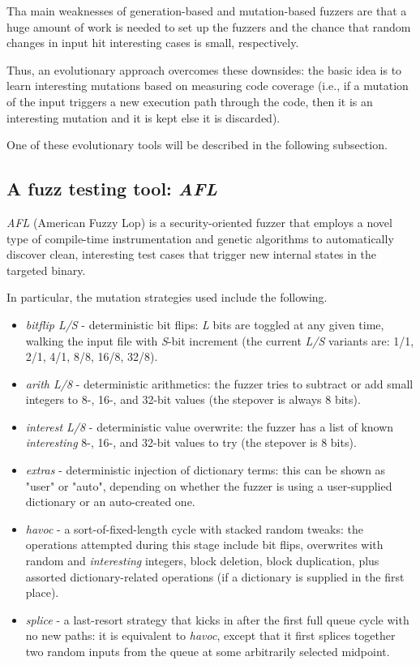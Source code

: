 Tha main weaknesses of generation-based and mutation-based fuzzers are that a huge amount of work is needed to set up the fuzzers and the chance that random changes in input hit interesting cases is small, respectively.

Thus, an evolutionary approach overcomes these downsides: the basic idea is to learn interesting mutations based on measuring code coverage (i.e., if a mutation of the input triggers a new execution path through the code, then it is an interesting mutation and it is kept else it is discarded).

One of these evolutionary tools will be described in the following subsection.

\subsection{A fuzz testing tool: \textit{AFL}}
\textit{AFL}\parencite{AFL} (American Fuzzy Lop) is a security-oriented fuzzer that employs a novel type of compile-time instrumentation and genetic algorithms to automatically discover clean, interesting test cases that trigger new internal states in the targeted binary.

In particular, the mutation strategies used include the following\parencite{AFL_status}.
\begin{itemize}[itemsep=1pt]
    \item \textit{bitflip L/S} - deterministic bit flips: \textit{L} bits are toggled at any given time, walking the input file with \textit{S}-bit increment (the current \textit{L/S} variants are: 1/1, 2/1, 4/1, 8/8, 16/8, 32/8).
    \item \textit{arith L/8} - deterministic arithmetics: the fuzzer tries to subtract or add small integers to 8-, 16-, and 32-bit values (the stepover is always 8 bits).
    \item \textit{interest L/8} - deterministic value overwrite: the fuzzer has a list of known \textit{interesting} 8-, 16-, and 32-bit values to try (the stepover is 8 bits).
    \item \textit{extras} - deterministic injection of dictionary terms: this can be shown as "user" or "auto", depending on whether the fuzzer is using a user-supplied dictionary or an auto-created one.
    \item \textit{havoc} - a sort-of-fixed-length cycle with stacked random tweaks: the operations attempted during this stage include bit flips, overwrites with random and \textit{interesting} integers, block deletion, block duplication, plus assorted dictionary-related operations (if a dictionary is supplied in the first place).
    \item \textit{splice} - a last-resort strategy that kicks in after the first full queue cycle with no new paths: it is equivalent to \textit{havoc}, except that it first splices together two random inputs from the queue at some arbitrarily selected midpoint.
\end{itemize}

